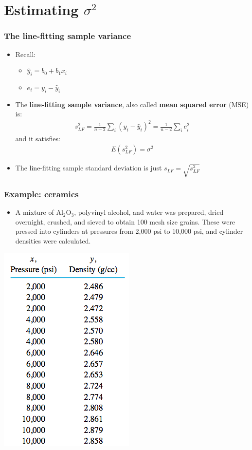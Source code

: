 \documentclass[handout]{beamer}\usepackage{graphicx, color}
\providecommand{\wh}[1]{\widehat{#1}}
\numberwithin{equation}{section}
\begin{document}
\section{Estimating $\sigma^2$}

\begin{frame}
\frametitle{The line-fitting sample variance}
\begin{itemize}
\item Recall:
\begin{itemize}
\item $\wh{y}_i = b_0 + b_1 x_i $
\pause \item $e_i = y_i - \wh{y}_i$
\end{itemize}
\pause \item The {\bf line-fitting sample variance}, also called {\bf mean squared error} (MSE) is:
\pause \begin{align*}
s_{LF}^2 = \frac{1}{n-2}\sum_i (y_i - \wh{y}_i)^2 = \frac{1}{n-2} \sum_i e_i^2
\end{align*}
\pause and it satisfies:
\pause \begin{align*}
E(s_{LF}^2) = \sigma^2
\end{align*}
\pause \item The line-fitting sample standard deviation is just $s_{LF} = \sqrt{s_{LF}^2}$
\end{itemize}
\end{frame}


\begin{frame}
\frametitle{Example: ceramics} \small
\begin{itemize}
\item A mixture of Al${}_2$O${}_3$, polyvinyl alcohol, and water was prepared, dried overnight, crushed, and sieved to obtain 100 mesh size grains. These were pressed into cylinders at pressures from 2,000 psi to 10,000 psi, and cylinder densities were calculated.
\end{itemize}
\begin{center}
 \includegraphics{../../fig/ceramicdat.png}
\end{center}
\end{frame}
\end{document}

